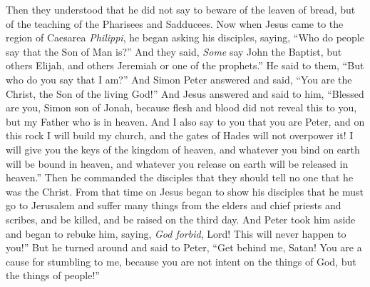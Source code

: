 \begin{biblechapter}
\verse Then they understood that he did not say to beware of the leaven of bread, but of the teaching of the Pharisees and Sadducees.
 Now when Jesus came to the region of Caesarea \textit{Philippi}, he began asking his disciples, saying, “Who do people say that the Son of Man is?”
\verse And they said, \textit{Some} say John the Baptist, but others Elijah, and others Jeremiah or one of the prophets.”
\verse He said to them, “But who do you say that I am?”
\verse And Simon Peter answered and said, “You are the Christ, the Son of the living God!”
\verse And Jesus answered and said to him, “Blessed are you, Simon son of Jonah, because flesh and blood did not reveal this to you, but my Father who is in heaven.
\verse And I also say to you that you are Peter, and on this rock I will build my church, and the gates of Hades will not overpower it!
\verse I will give you the keys of the kingdom of heaven, and whatever you bind on earth will be bound in heaven, and whatever you release on earth will be released in heaven.”
\verse Then he commanded the disciples that they should tell no one that he was the Christ.
 From that time on Jesus began to show his disciples that he must go to Jerusalem and suffer many things from the elders and chief priests and scribes, and be killed, and be raised on the third day.
\verse And Peter took him aside and began to rebuke him, saying, \textit{God forbid}, Lord! This will never happen to you!”
\verse But he turned around and said to Peter, “Get behind me, Satan! You are a cause for stumbling to me, because you are not intent on the things of God, but the things of people!”

\end{biblechapter}
